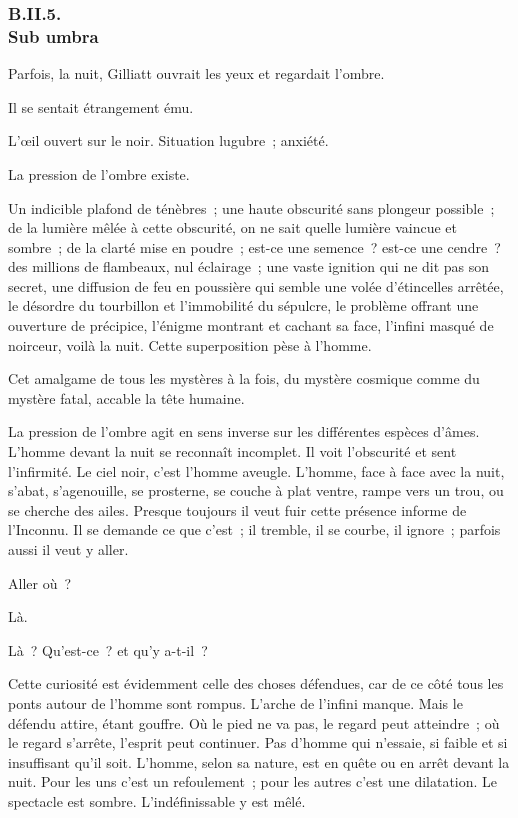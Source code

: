 \documentclass[french,twoside]{book} %
\begin{document}
 \subsubsection[{B.II.5. Sub umbra}]{B.II.5. \\
Sub umbra}
\noindent Parfois, la nuit, Gilliatt ouvrait les yeux et regardait l’ombre.\par
Il se sentait étrangement ému.\par
L’œil ouvert sur le noir. Situation lugubre ; anxiété.\par
La pression de l’ombre existe.\par
Un indicible plafond de ténèbres ; une haute obscurité sans plongeur possible ; de la lumière mêlée à cette obscurité, on ne sait quelle lumière vaincue et sombre ; de la clarté mise en poudre ; est-ce une semence ? est-ce une cendre ? des millions de flambeaux, nul éclairage ; une vaste ignition qui ne dit pas son secret, une diffusion de feu en poussière qui semble une volée d’étincelles arrêtée, le désordre du tourbillon et l’immobilité du sépulcre, le problème offrant une ouverture de précipice, l’énigme montrant et cachant sa face, l’infini masqué de noirceur, voilà la nuit. Cette superposition pèse à l’homme.\par
Cet amalgame de tous les mystères à la fois, du mystère cosmique comme du mystère fatal, accable la tête humaine.\par
 La pression de l’ombre agit en sens inverse sur les différentes espèces d’âmes. L’homme devant la nuit se reconnaît incomplet. Il voit l’obscurité et sent l’infirmité. Le ciel noir, c’est l’homme aveugle. L’homme, face à face avec la nuit, s’abat, s’agenouille, se prosterne, se couche à plat ventre, rampe vers un trou, ou se cherche des ailes. Presque toujours il veut fuir cette présence informe de l’Inconnu. Il se demande ce que c’est ; il tremble, il se courbe, il ignore ; parfois aussi il veut y aller.\par
Aller où ?\par
Là.\par
Là ? Qu’est-ce ? et qu’y a-t-il ?\par
Cette curiosité est évidemment celle des choses défendues, car de ce côté tous les ponts autour de l’homme sont rompus. L’arche de l’infini manque. Mais le défendu attire, étant gouffre. Où le pied ne va pas, le regard peut atteindre ; où le regard s’arrête, l’esprit peut continuer. Pas d’homme qui n’essaie, si faible et si insuffisant qu’il soit. L’homme, selon sa nature, est en quête ou en arrêt devant la nuit. Pour les uns c’est un refoulement ; pour les autres c’est une dilatation. Le spectacle est sombre. L’indéfinissable y est mêlé.\par
\end{document}
